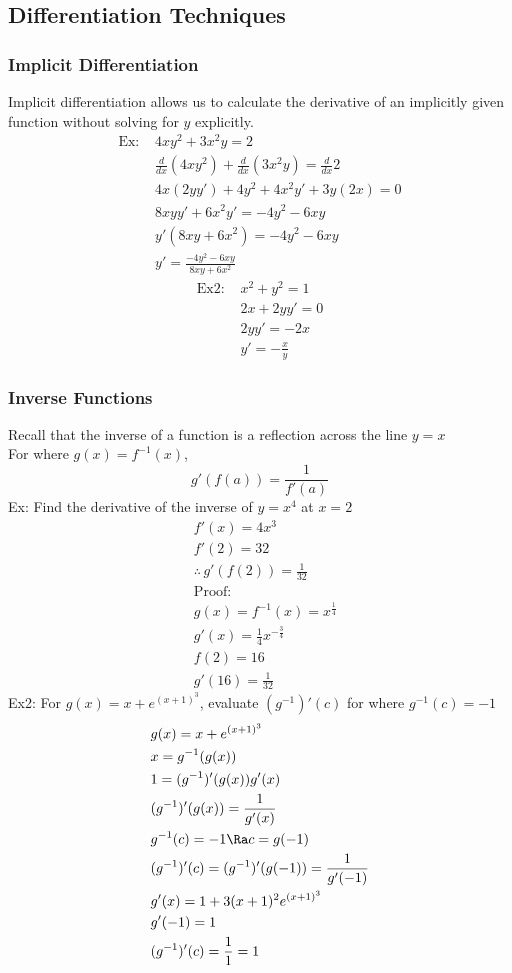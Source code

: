 \subsection{Differentiation Techniques}

\subsubsection{Implicit Differentiation}
Implicit differentiation allows us to calculate the derivative of an implicitly given function without solving for $y$ explicitly.
\begin{align*}
    \text{Ex: }&4xy^2+3x^2y=2\\
    &\frac{d}{dx}(4xy^2)+\frac{d}{dx}(3x^2y)=\frac{d}{dx}2\\
    &4x(2yy')+4y^2+4x^2y'+3y(2x)=0\\
    &8xyy'+6x^2y'=-4y^2-6xy\\
    &y'(8xy+6x^2)=-4y^2-6xy\\
    &y'=\frac{-4y^2-6xy}{8xy+6x^2}
\end{align*}
\begin{align*}
    \text{Ex2: }&x^2+y^2=1\\
    &2x+2yy'=0\\
    &2yy'=-2x\\
    &y'=-\frac{x}{y}
\end{align*}

\subsubsection{Inverse Functions}
Recall that the inverse of a function is a reflection across the line $y=x$\\
For where $g(x)=f^{-1}(x)$,
$$g'(f(a))=\frac{1}{f'(a)}$$
Ex: Find the derivative of the inverse of $y=x^4$ at $x=2$
\begin{align*}
    &f'(x)=4x^3\\
    &f'(2)=32\\
    &\therefore\,g'(f(2))=\frac{1}{32}\\
    &\text{Proof:}\\
    &g(x)=f^{-1}(x)=x^{\frac{1}{4}}\\
    &g'(x)=\frac{1}{4}x^{-\frac{3}{4}}\\
    &f(2)=16\\
    &g'(16)=\frac{1}{32}
\end{align*}
Ex2: For $g(x)=x+e^{(x+1)^3}$, evaluate $(g^{-1})'(c)$ for where $g^{-1}(c)=-1$
\begin{align*}
    &g(x)=x+e^{(x+1)^3}\\
    &x=g^{-1}(g(x))\\
    &1=(g^{-1})'(g(x))g'(x)\\
    &(g^{-1})'(g(x))=\frac{1}{g'(x)}\\
    &g^{-1}(c)=-1\Ra c=g(-1)\\
    &(g^{-1})'(c)=(g^{-1})'(g(-1))=\frac{1}{g'(-1)}\\
    &g'(x)=1+3(x+1)^2e^{(x+1)^3}\\
    &g'(-1)=1\\
    &(g^{-1})'(c)=\frac{1}{1}=1
\end{align*}
